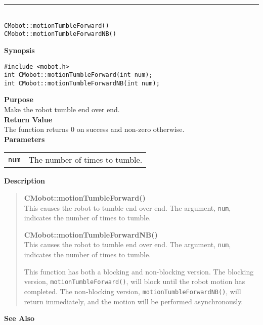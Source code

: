 \noindent
\vspace{5pt}
\rule{4.5in}{0.015in}\\
\noindent
{\LARGE \texttt{CMobot::motionTumbleForward()}}\\
{\LARGE \texttt{CMobot::motionTumbleForwardNB()}}\\
{}

\noindent
{\bf Synopsis}
\vspace{-8pt}
\begin{verbatim}
#include <mobot.h>
int CMobot::motionTumbleForward(int num);
int CMobot::motionTumbleForwardNB(int num);
\end{verbatim}

\noindent
{\bf Purpose}\\
Make the robot tumble end over end.\\

\noindent
{\bf Return Value}\\
The function returns 0 on success and non-zero otherwise.\\

\noindent
{\bf Parameters}\\
\vspace{-0.1in}
\begin{description}
\item               
\begin{tabular}{p{10 mm}p{145 mm}}
\texttt{num} & The number of times to tumble. \\
\end{tabular}
\end{description}

\noindent
{\bf Description}\\
\vspace{-12pt}
\begin{quote}
{\bf CMobot::motionTumbleForward()}\\
This causes the robot to tumble end over end. The argument, \texttt{num},
indicates the number of times to tumble.

{\bf CMobot::motionTumbleForwardNB()}\\
This causes the robot to tumble end over end. The argument, \texttt{num},
indicates the number of times to tumble.

This function has both a blocking and non-blocking version.
The blocking version, \texttt{motionTumbleForward()}, will block until the
robot motion has completed. The non-blocking version, \texttt{motionTumbleForwardNB()},
will return immediately, and the motion will be performed asynchronously.\\
\end{quote}

\noindent
{\bf See Also}\\

